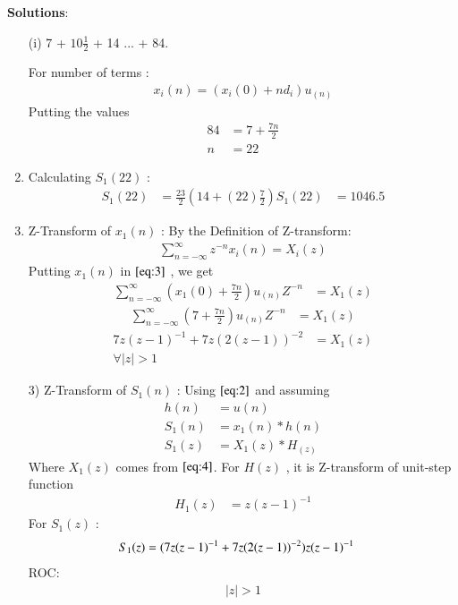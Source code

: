 \documentclass[journal,12pt,twocolumn]{IEEEtran}
\theoremstyle{remark}
\begin{document}
\vspace{0.5cm}
\textbf{Solutions}:
\begin{enumerate}
\item[(i)]   
7 + $10\frac{1}{2}$ + 14 ... + 84.

\vspace{0.15cm}
For number of terms :
\begin{align}
x_i(n) = (x_i(0) + nd_i)u_{(n)}\label{eq:2}
\end{align}
Putting the values
\begin{align}  
84 &= 7+\frac{7n}{2}\\
n &= 22
\end{align}
\item 
Calculating $S_1(22)$ : 
\begin{align}
    S_1{(22)} &= \frac{23}{2}(14+(22)\frac{7}{2})
    S_1{(22)} &= 1046.5
    \end{align} 

\vspace{0.1cm}
\item 
Z-Transform of $x_1(n)$ :
\vspace{0.2cm}
By the Definition of Z-transform:
\begin{align}
 \sum_{n=-\infty}^{\infty} z^{-n}x_i(n) = X_i(z)\label{eq:3}
 \end{align}
\vspace{0.05cm}Putting $x_1(n)$ in $\eqref{eq:3}$ , we get \vspace{0.05cm}
\begin{align}
     \sum_{n=-\infty}^{\infty}(x_1(0) + \frac{7n}{2})u_{(n)}Z^{-n} &= X_1(z)
\end{align}
\begin{align}
\sum_{n=-\infty}^{\infty}(7 + \frac{7n}{2})u_{(n)}Z^{-n} &= X_1(z)
\end{align}
\begin{align}
7z(z-1)^{-1} + 7z(2(z-1))^{-2} &= X_1(z) \label{eq:4}\\
\forall \lvert z \rvert  >  1 
\end{align}
\vspace{4cm}
\item[3)]
Z-Transform of $S_1(n)$ :
Using $\eqref{eq:2}$ and assuming 
\begin{align}
         h(n) &= u(n) \\
    S_1(n) &= x_1(n) * h(n) \\
    S_1(z) &= X_1(z) * H_(z)
    \end{align}
    Where $X_1(z)$ comes from $\eqref{eq:4}$.
    \vspace{0.05cm}
    For $H(z)$ , it is Z-transform of unit-step function
    \begin{align}
        H_1(z) &= z(z-1)^{-1} \label{eq:9}
    \end{align}
    For $S_1(z)$ :
    \begin{align}
S_1(z) &= \notag(7z(z-1)^{-1}+
7z(2(z-1))^{-2})z(z-1)^{-1}
    \end{align}
    ROC:
    \begin{align} 
    \lvert z \rvert > 1
    \end{align}
    

\end{enumerate}
\end{document}
